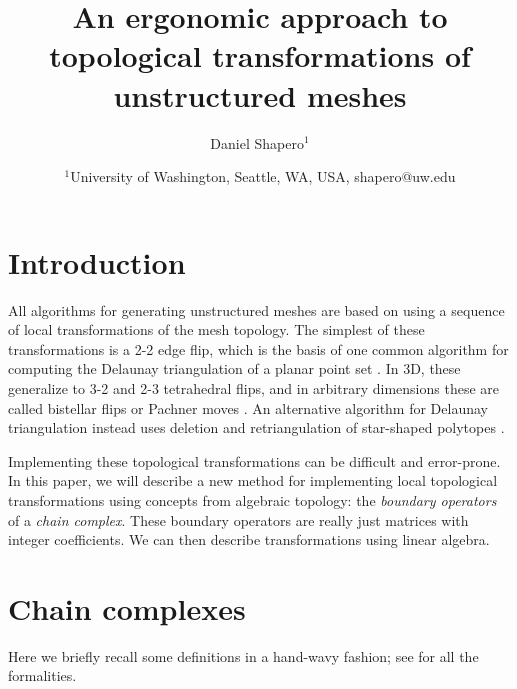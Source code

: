 \documentclass[twocolumn]{article}
\begin{document}
\title{An ergonomic approach to topological transformations of unstructured meshes}
\author{Daniel Shapero$^1$}
\date{
    $^1$University of Washington, Seattle, WA, USA, shapero@uw.edu
}



\maketitle
\thispagestyle{empty}
\pagestyle{empty}


\section{Introduction}

All algorithms for generating unstructured meshes are based on using a sequence of local transformations of the mesh topology.
The simplest of these transformations is a 2-2 edge flip, which is the basis of one common algorithm for computing the Delaunay triangulation of a planar point set \cite{lawson1972transforming}.
In 3D, these generalize to 3-2 and 2-3 tetrahedral flips, and in arbitrary dimensions these are called bistellar flips or Pachner moves \cite{pachner1991pl}.
An alternative algorithm for Delaunay triangulation instead uses deletion and retriangulation of star-shaped polytopes \cite{bowyer1981computing, watson1981computing}.

Implementing these topological transformations can be difficult and error-prone.
In this paper, we will describe a new method for implementing local topological transformations using concepts from algebraic topology: the \emph{boundary operators} of a \emph{chain complex}.
These boundary operators are really just matrices with integer coefficients.
We can then describe transformations using linear algebra.


\section{Chain complexes}

Here we briefly recall some definitions in a hand-wavy fashion; see \cite{hatcher2002algebraic} for all the formalities.
\end{document}
